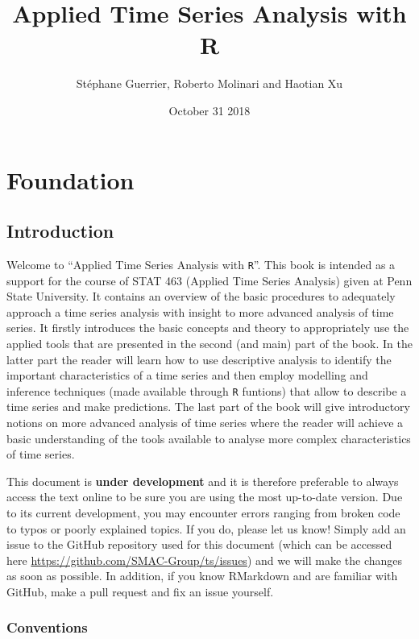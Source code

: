\documentclass[]{book}
\title{Applied Time Series Analysis with R}
\author{Stéphane Guerrier, Roberto Molinari and Haotian Xu}
\date{October 31 2018}
\theoremstyle{definition}
\theoremstyle{definition}
\theoremstyle{definition}
\theoremstyle{remark}
\let\BeginKnitrBlock\begin \let\EndKnitrBlock\end
\begin{document}
\maketitle

{
\setcounter{tocdepth}{1}
\tableofcontents
}
\hypertarget{part-foundation}{%
\part{Foundation}\label{part-foundation}}

\hypertarget{introduction}{%
\chapter{Introduction}\label{introduction}}

Welcome to ``Applied Time Series Analysis with \texttt{R}''. This book
is intended as a support for the course of STAT 463 (Applied Time Series
Analysis) given at Penn State University. It contains an overview of the
basic procedures to adequately approach a time series analysis with
insight to more advanced analysis of time series. It firstly introduces
the basic concepts and theory to appropriately use the applied tools
that are presented in the second (and main) part of the book. In the
latter part the reader will learn how to use descriptive analysis to
identify the important characteristics of a time series and then employ
modelling and inference techniques (made available through \texttt{R}
funtions) that allow to describe a time series and make predictions. The
last part of the book will give introductory notions on more advanced
analysis of time series where the reader will achieve a basic
understanding of the tools available to analyse more complex
characteristics of time series.

\BeginKnitrBlock{rmdimportant}
This document is \textbf{under development} and it is therefore
preferable to always access the text online to be sure you are using the
most up-to-date version. Due to its current development, you may
encounter errors ranging from broken code to typos or poorly explained
topics. If you do, please let us know! Simply add an issue to the GitHub
repository used for this document (which can be accessed here
\url{https://github.com/SMAC-Group/ts/issues}) and we will make the
changes as soon as possible. In addition, if you know RMarkdown and are
familiar with GitHub, make a pull request and fix an issue yourself.
\EndKnitrBlock{rmdimportant}

\hypertarget{conventions}{%
\section{Conventions}\label{conventions}}
\end{document}
